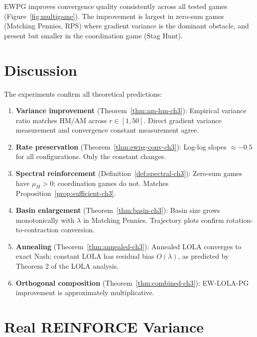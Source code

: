EWPG improves convergence quality consistently across all tested games (Figure~\ref{fig:multigame}). The improvement is largest in zero-sum games (Matching Pennies, RPS) where gradient variance is the dominant obstacle, and present but smaller in the coordination game (Stag Hunt).


\section{Discussion}
\label{sec:exp-discussion}

The experiments confirm all theoretical predictions:

\begin{enumerate}
    \item \textbf{Variance improvement} (Theorem~\ref{thm:am-hm-ch3}): Empirical variance ratio matches HM/AM across $r \in [1, 50]$. Direct gradient variance measurement and convergence constant measurement agree.
    \item \textbf{Rate preservation} (Theorem~\ref{thm:ewpg-conv-ch3}): Log-log slopes $\approx -0.5$ for all configurations. Only the constant changes.
    \item \textbf{Spectral reinforcement} (Definition~\ref{def:spectral-ch3}): Zero-sum games have $\mu_H > 0$; coordination games do not. Matches Proposition~\ref{prop:sufficient-ch3}.
    \item \textbf{Basin enlargement} (Theorem~\ref{thm:basin-ch3}): Basin size grows monotonically with $\lambda$ in Matching Pennies. Trajectory plots confirm rotation-to-contraction conversion.
    \item \textbf{Annealing} (Theorem~\ref{thm:annealed-ch3}): Annealed LOLA converges to exact Nash; constant LOLA has residual bias $O(\lambda)$, as predicted by Theorem 2 of the LOLA analysis.
    \item \textbf{Orthogonal composition} (Theorem~\ref{thm:combined-ch3}): EW-LOLA-PG improvement is approximately multiplicative.
\end{enumerate}

\section{Real REINFORCE Variance}
\label{sec:exp-real-reinforce}

